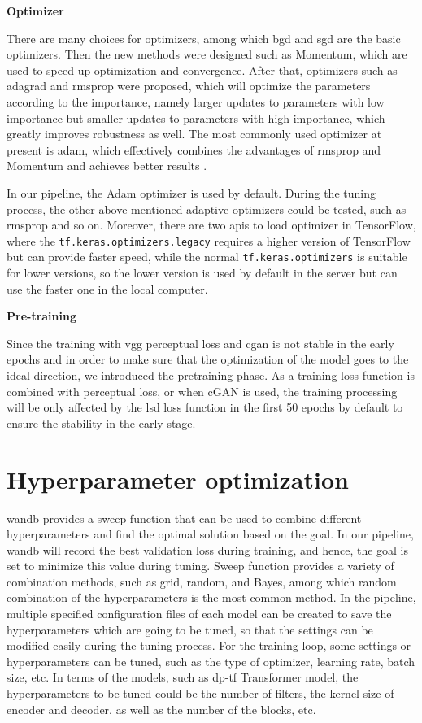 \begin{spacing}{1.5}
\textbf{\large{Optimizer}}
\end{spacing}
There are many choices for optimizers, among which \gls{bgd} and \gls{sgd} are the basic optimizers. Then the new methods were designed such as Momentum, which are used to speed up optimization and convergence. After that, optimizers such as \gls{adagrad} and \gls{rmsprop} were proposed, which will optimize the parameters according to the importance, namely larger updates to parameters with low importance but smaller updates to parameters with high importance, which greatly improves robustness as well. The most commonly used optimizer at present is \gls{adam}, which effectively combines the advantages of \gls{rmsprop} and Momentum and achieves better results \cite{kingma_adam_2017}.

In our pipeline, the Adam optimizer is used by default. During the tuning process, the other above-mentioned adaptive optimizers could be tested, such as \gls{rmsprop} and so on. Moreover, there are two \gls{api}s to load optimizer in TensorFlow, where the \texttt{tf.keras.optimizers.legacy} requires a higher version of TensorFlow but can provide faster speed, while the normal \texttt{tf.keras.optimizers} is suitable for lower versions, so the lower version is used by default in the server but can use the faster one in the local computer.

\begin{spacing}{1.5}
\textbf{\large{Pre-training}}
\end{spacing}
Since the training with \gls{vgg} perceptual loss and \gls{cgan} is not stable in the early epochs and in order to make sure that the optimization of the model goes to the ideal direction, we introduced the pretraining phase. As a training loss function is combined with perceptual loss, or when cGAN is used, the training processing will be only affected by the \gls{lsd} loss function in the first 50 epochs by default to ensure the stability in the early stage.


\section{Hyperparameter optimization} \label{hyperparameter optimization}
\gls{wandb} provides a sweep function that can be used to combine different hyperparameters and find the optimal solution based on the goal. In our pipeline, \gls{wandb} will record the best validation loss during training, and hence, the goal is set to minimize this value during tuning. Sweep function provides a variety of combination methods, such as grid, random, and Bayes, among which random combination of the hyperparameters is the most common method. In the pipeline, multiple specified configuration files of each model can be created to save the hyperparameters which are going to be tuned, so that the settings can be modified easily during the tuning process. For the training loop, some settings or hyperparameters can be tuned, such as the type of optimizer, learning rate, batch size, etc. In terms of the models, such as \gls{dp}-\gls{tf} Transformer model, the hyperparameters to be tuned could be the number of filters, the kernel size of encoder and decoder, as well as the number of the blocks, etc.